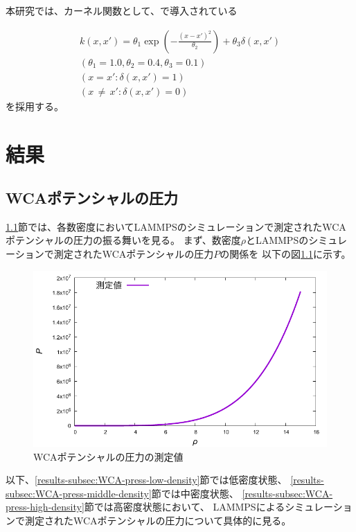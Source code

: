\documentclass[titlepage]{jsreport}
\begin{document}
{{{本研究では、カーネル関数として、\cite{Gauss-machine-learning}で導入されている

\large
\begin{eqnarray}
    k(x,x')=\theta_1\exp\left(-\frac{(x-x')^2}{\theta_2}\right)+\theta_3\delta(x,x')\\ \label{eq:Gauss-kernel}
    (\theta_1=1.0,\theta_2=0.4,\theta_3=0.1) \nonumber \\ 
    (x=x':\delta(x,x')=1) \nonumber \\
    (x\,{\neq}\,x':\delta(x,x')=0) \nonumber
\end{eqnarray}
\normalsize
を採用する。

\chapter{結果} \label{chap:results}

\section{WCAポテンシャルの圧力}\label{results-sec:WCA-press}
\ref{results-sec:WCA-press}節では、各数密度においてLAMMPSのシミュレーションで測定されたWCAポテンシャルの圧力の振る舞いを見る。
まず、数密度$\rho$とLAMMPSのシミュレーションで測定されたWCAポテンシャルの圧力$P$の関係を
以下の図\ref{fig:den-pre}に示す。

\begin{figure}[htbp]
    \begin{center}
        \includegraphics[width=14cm]{fig/den-pre.pdf}
    \end{center}
    \caption{WCAポテンシャルの圧力の測定値}
    \label{fig:den-pre}
\end{figure}

以下、\ref{results-subsec:WCA-press-low-density}節では低密度状態、
\ref{results-subsec:WCA-press-middle-density}節では中密度状態、
\ref{results-subsec:WCA-press-high-density}節では高密度状態において、
LAMMPSによるシミュレーションで測定されたWCAポテンシャルの圧力について具体的に見る。


}}}
\end{document}
